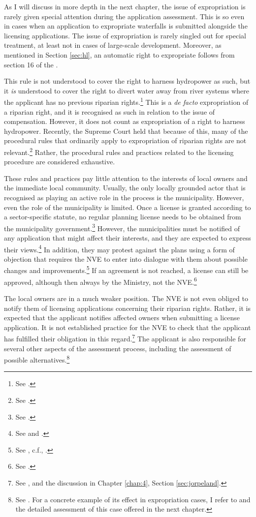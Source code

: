 As I will discuss in more depth in the next chapter, the issue of expropriation is rarely given special attention during the application assessment. This is so even in cases when an application to expropriate waterfalls is submitted alongside the licensing applications. The issue of expropriation is rarely singled out for special treatment, at least not in cases of large-scale development. Moreover, as mentioned in Section \ref{sec:hl}, an automatic right to expropriate follows from section 16 of the \cite{wra17}.

This rule is not understood to cover the right to harness hydropower as such, but it {\it is} understood to cover the right to divert water away from river systems where the applicant has no previous riparian rights.\footnote{See \cite{jorpeland11}.} This is a {\it de facto} expropriation of a riparian right, and it is recognised as such in relation to the issue of compensation. However, it does not count as expropriation of a right to harness hydropower. Recently, the Supreme Court held that because of this,  many of the procedural rules that ordinarily apply to expropriation of riparian rights are not relevant.\footnote{See \cite{jorpeland11}.} Rather, the procedural rules and practices related to the licensing procedure are considered exhaustive.

These rules and practices pay little attention to the interests of local owners and the immediate local community. Usually, the only locally grounded actor that is recognised as playing an active role in the process is the municipality. However, even the role of the municipality is limited. Once a license is granted according to a sector-specific statute, no regular planning license needs to be obtained from the municipality government.\footnote{See \cite[12-1]{pb08}.} However, the municipalities must be notified of any application that might affect their interests, and they are expected to express their views.\footnote{See \cite[8]{wra17} and \cite[24]{wra00}.} In addition, they may protest against the plans using a form of objection that requires the NVE to enter into dialogue with them about possible changes and improvements.\footnote{See \cite[5-4,5-6]{pb08}, c.f., \cite[24]{wra00}.} If an agreement is not reached, a license can still be approved, although then always by the Ministry, not the NVE.\footnote{See \cite[5-6]{pb08}.}

The local owners are in a much weaker position. The NVE is not even obliged to notify them of licensing applications concerning their riparian rights. Rather, it is expected that the applicant notifies affected owners when submitting a license application. It is not established practice for the NVE to check that the applicant has fulfilled their obligation in this regard.\footnote{See \cite{jorpeland11}, and the discussion in Chapter \ref{chap:4}, Section \ref{sec:jorpeland}.} The applicant is also responsible for several other aspects of the assessment process, including the assessment of possible alternatives.\footnote{See \cite{stokker10}. For a concrete example of its effect in expropriation cases, I refer to \cite{jorpeland11} and the detailed assessment of this case offered in the next chapter.}

